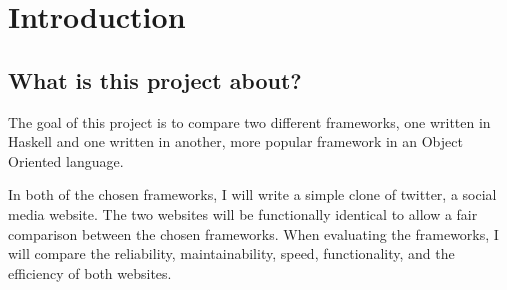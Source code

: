 \section{Introduction}

\subsection{What is this project about?}
The goal of this project is to compare two different frameworks, one written in Haskell and one written in another, more popular framework in an Object Oriented language.

In both of the chosen frameworks, I will write a simple clone of twitter, a social media website. The two websites will be functionally identical to allow a fair comparison between the chosen frameworks. When evaluating the frameworks, I will compare the reliability, maintainability, speed, functionality, and the efficiency of both websites.
